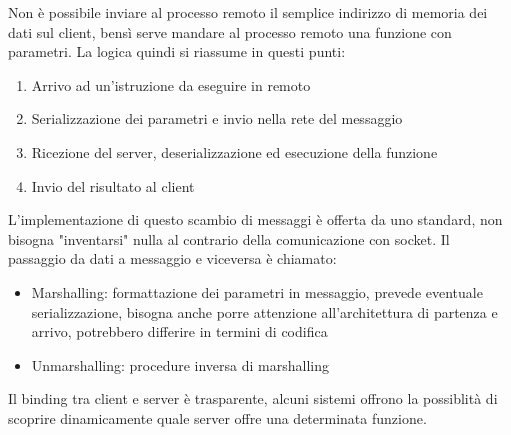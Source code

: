 Non è possibile inviare al processo remoto il semplice indirizzo di memoria dei 
dati sul client, bensì serve mandare al processo remoto una funzione con parametri.
La logica quindi si riassume in questi punti:
\begin{enumerate}
    \item Arrivo ad un'istruzione da eseguire in remoto
    \item Serializzazione dei parametri e invio nella rete del messaggio
    \item Ricezione del server, deserializzazione ed esecuzione della funzione
    \item Invio del risultato al client
\end{enumerate}
L'implementazione di questo scambio di messaggi è offerta da uno standard, 
non bisogna "inventarsi" nulla al contrario della comunicazione con socket.
Il passaggio da dati a messaggio e viceversa è chiamato:
\begin{itemize}
    \item Marshalling: formattazione dei parametri in messaggio, prevede
    eventuale serializzazione, bisogna anche porre attenzione all'architettura
    di partenza e arrivo, potrebbero differire in termini di codifica
    \item Unmarshalling: procedure inversa di marshalling
\end{itemize}
Il binding tra client e server è trasparente, alcuni sistemi offrono la possiblità 
di scoprire dinamicamente quale server offre una determinata funzione.


